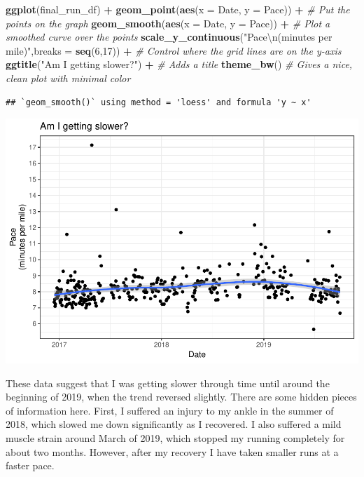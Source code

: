 \documentclass[]{article}
\newenvironment{Shaded}{\begin{snugshade}}{\end{snugshade}}
\newcommand{\CharTok}[1]{\textcolor[rgb]{0.31,0.60,0.02}{#1}}
\newcommand{\CommentTok}[1]{\textcolor[rgb]{0.56,0.35,0.01}{\textit{#1}}}
\newcommand{\DataTypeTok}[1]{\textcolor[rgb]{0.13,0.29,0.53}{#1}}
\newcommand{\DecValTok}[1]{\textcolor[rgb]{0.00,0.00,0.81}{#1}}
\newcommand{\KeywordTok}[1]{\textcolor[rgb]{0.13,0.29,0.53}{\textbf{#1}}}
\newcommand{\NormalTok}[1]{#1}
\newcommand{\OperatorTok}[1]{\textcolor[rgb]{0.81,0.36,0.00}{\textbf{#1}}}
\newcommand{\StringTok}[1]{\textcolor[rgb]{0.31,0.60,0.02}{#1}}
\begin{document}
\begin{Shaded}
\begin{Highlighting}[]
\KeywordTok{ggplot}\NormalTok{(final_run_df) }\OperatorTok{+}
\StringTok{  }\KeywordTok{geom_point}\NormalTok{(}\KeywordTok{aes}\NormalTok{(}\DataTypeTok{x =}\NormalTok{ Date, }\DataTypeTok{y =}\NormalTok{ Pace)) }\OperatorTok{+}\StringTok{ }\CommentTok{# Put the points on the graph}
\StringTok{  }\KeywordTok{geom_smooth}\NormalTok{(}\KeywordTok{aes}\NormalTok{(}\DataTypeTok{x =}\NormalTok{ Date, }\DataTypeTok{y =}\NormalTok{ Pace)) }\OperatorTok{+}\StringTok{ }\CommentTok{# Plot a smoothed curve over the points}
\StringTok{  }\KeywordTok{scale_y_continuous}\NormalTok{(}\StringTok{"Pace}\CharTok{\textbackslash{}n}\StringTok{(minutes per mile)"}\NormalTok{,}\DataTypeTok{breaks =} \KeywordTok{seq}\NormalTok{(}\DecValTok{6}\NormalTok{,}\DecValTok{17}\NormalTok{)) }\OperatorTok{+}\StringTok{ }\CommentTok{# Control where the grid lines are on the y-axis}
\StringTok{  }\KeywordTok{ggtitle}\NormalTok{(}\StringTok{"Am I getting slower?"}\NormalTok{) }\OperatorTok{+}\StringTok{ }\CommentTok{# Adds a title}
\StringTok{  }\KeywordTok{theme_bw}\NormalTok{() }\CommentTok{# Gives a nice, clean plot with minimal color}
\end{Highlighting}
\end{Shaded}

\begin{verbatim}
## `geom_smooth()` using method = 'loess' and formula 'y ~ x'
\end{verbatim}

\includegraphics{my_running_data_files/figure-latex/unnamed-chunk-4-1.pdf}

These data suggest that I was getting slower through time until around
the beginning of 2019, when the trend reversed slightly. There are some
hidden pieces of information here. First, I suffered an injury to my
ankle in the summer of 2018, which slowed me down significantly as I
recovered. I also suffered a mild muscle strain around March of 2019,
which stopped my running completely for about two months. However, after
my recovery I have taken smaller runs at a faster pace.
\end{document}
